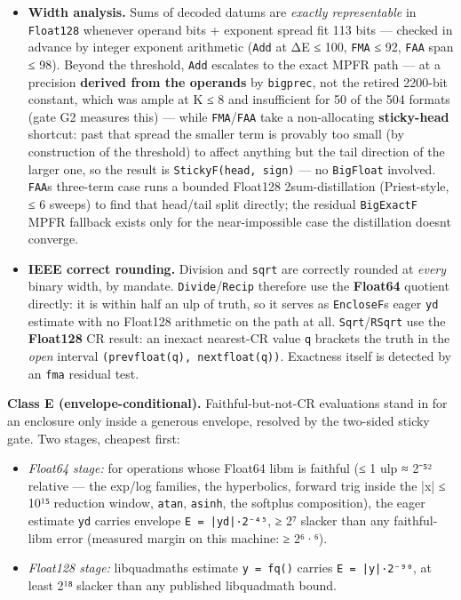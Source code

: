 \begin{itemize}
\item \textbf{Width analysis.} Sums of decoded datums are \emph{exactly representable} in \texttt{Float128} whenever operand bits + exponent spread fit 113 bits — checked in advance by integer exponent arithmetic (\texttt{Add} at ΔE ≤ 100, \texttt{FMA} ≤ 92, \texttt{FAA} span ≤ 98). Beyond the threshold, \texttt{Add} escalates to the exact MPFR path — at a precision \textbf{derived from the operands} by \texttt{bigprec}, not the retired 2200-bit constant, which was ample at K ≤ 8 and insufficient for 50 of the 504 formats (gate G2 measures this) — while \texttt{FMA}/\allowbreak\texttt{FAA} take a non-allocating \textbf{sticky-head} shortcut: past that spread the smaller term is provably too small (by construction of the threshold) to affect anything but the tail direction of the larger one, so the result is \texttt{StickyF(head, sign)} — no \texttt{BigFloat} involved. \texttt{FAA}{\textquotesingle}s three-term case runs a bounded Float128 2sum-distillation (Priest-style, ≤ 6 sweeps) to find that head/tail split directly; the residual \texttt{BigExactF} MPFR fallback exists only for the near-impossible case the distillation doesn{\textquotesingle}t converge.


\item \textbf{IEEE correct rounding.} Division and \texttt{sqrt} are correctly rounded at \emph{every} binary width, by mandate. \texttt{Divide}/\allowbreak\texttt{Recip} therefore use the \textbf{Float64} quotient directly: it is within half an ulp of truth, so it serves as \texttt{EncloseF}{\textquotesingle}s eager \texttt{yd} estimate with no Float128 arithmetic on the path at all. \texttt{Sqrt}/\allowbreak\texttt{RSqrt} use the \textbf{Float128} CR result: an inexact nearest-CR value \texttt{q} brackets the truth in the \emph{open} interval \texttt{(\allowbreak{}prevfloat(\allowbreak{}q), nextfloat(\allowbreak{}q))}. Exactness itself is detected by an \texttt{fma} residual test.

\end{itemize}


\textbf{Class E (envelope-conditional).} Faithful-but-not-CR evaluations stand in for an enclosure only inside a generous envelope, resolved by the two-sided sticky gate. Two stages, cheapest first:



\begin{itemize}
\item \emph{Float64 stage:} for operations whose Float64 libm is faithful (≤ 1 ulp ≈ 2⁻⁵² relative — the exp/log families, the hyperbolics, forward trig inside the |x| ≤ 10¹⁵ reduction window, \texttt{atan}, \texttt{asinh}, the softplus composition), the eager estimate \texttt{yd} carries envelope \texttt{E = |yd|·2⁻⁴⁵}, ≥ 2⁷ slacker than any faithful-libm error (measured margin on this machine: ≥ 2⁶·⁶).


\item \emph{Float128 stage:} libquadmath{\textquotesingle}s estimate \texttt{y = fq()} carries \texttt{E = |y|·2⁻⁹⁰}, at least 2¹⁸ slacker than any published libquadmath bound.

\end{itemize}


